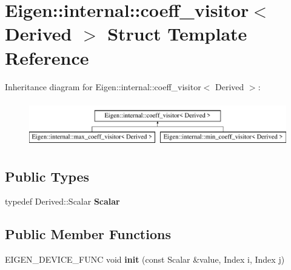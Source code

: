 \hypertarget{struct_eigen_1_1internal_1_1coeff__visitor}{}\section{Eigen\+::internal\+::coeff\+\_\+visitor$<$ Derived $>$ Struct Template Reference}
\label{struct_eigen_1_1internal_1_1coeff__visitor}
Inheritance diagram for Eigen\+::internal\+::coeff\+\_\+visitor$<$ Derived $>$\+:\begin{figure}[H]
\begin{center}
\leavevmode
\includegraphics[height=2.000000cm]{struct_eigen_1_1internal_1_1coeff__visitor}
\end{center}
\end{figure}
\subsection*{Public Types}
\begin{DoxyCompactItemize}
\item 
\mbox{\label{struct_eigen_1_1internal_1_1coeff__visitor_adfb8342e9131db6f1ebee928681ed031}} 
typedef Derived\+::\+Scalar {\bfseries Scalar}
\end{DoxyCompactItemize}
\subsection*{Public Member Functions}
\begin{DoxyCompactItemize}
\item 
\mbox{\label{struct_eigen_1_1internal_1_1coeff__visitor_a539c8a9892058be19907907f7298a100}} 
E\+I\+G\+E\+N\+\_\+\+D\+E\+V\+I\+C\+E\+\_\+\+F\+U\+NC void {\bfseries init} (const Scalar \&value, Index i, Index j)
\end{DoxyCompactItemize}
